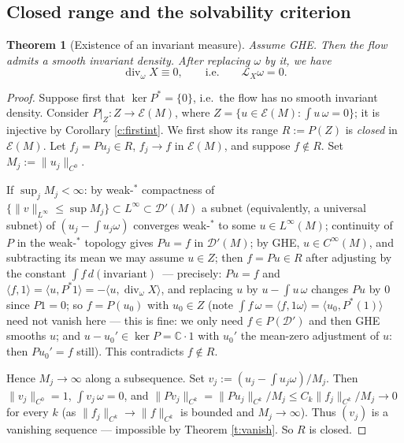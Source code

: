 \documentclass[11pt]{amsart}
\theoremstyle{plain}
\newtheorem{theorem}{Theorem}[section]
\theoremstyle{definition}
\theoremstyle{remark}
\newcommand{\DD}{\mathcal{D}'}
\newcommand{\EE}{\mathcal{E}}
\newcommand{\Lie}{\mathcal{L}}
\begin{document}
\subsection{Closed range and the solvability criterion}

\begin{theorem}[Existence of an invariant measure]\label{t:invmeas}
Assume GHE.  Then the flow admits a smooth invariant density.  After
replacing $\omega$ by it, we have
\begin{equation}\label{eq:divfree}
\operatorname{div}_\omega X\equiv0,\qquad\text{i.e.}\qquad
\Lie_X\omega=0 .
\end{equation}
\end{theorem}

\begin{proof}
Suppose first that $\ker P^*=\{0\}$, i.e.\ the flow has no smooth
invariant density.  Consider $P|_Z:Z\to \EE(M)$, where
$Z=\{u\in\EE(M):\int u\,\omega=0\}$; it is injective by Corollary
\ref{c:firstint}.  We first show its range
$R:=P(Z)$ is \emph{closed} in $\EE(M)$.  Let $f_j=P u_j\in R$,
$f_j\to f$ in $\EE(M)$, and suppose $f\notin R$.  Set
$M_j:=\|u_j\|_{C^0}$.

If $\sup_j M_j<\infty$: by weak-$^{\!*}$ compactness of
$\{\|v\|_{L^\infty}\le\sup M_j\}\subset L^\infty\subset\DD(M)$ a
subnet (equivalently, a universal subnet) of $(u_j-\int u_j\omega)$
converges weak-$^{\!*}$ to some $u\in L^\infty(M)$; continuity of
$P$ in the weak-$^{\!*}$ topology gives $Pu=f$ in $\DD(M)$; by GHE,
$u\in C^\infty(M)$, and subtracting its mean we may assume
$u\in Z$; then $f=Pu\in R$ after adjusting by the constant
$\int f\,d(\text{invariant})$\ --- precisely: $Pu=f$ and
$\langle f,1\rangle=\langle u,P^*1\rangle
=-\langle u,\operatorname{div}_\omega X\rangle$, and replacing
$u$ by $u-\int u\,\omega$ changes $Pu$ by $0$ since $P1=0$; so
$f=P(u_0)$ with $u_0\in Z$ (note $\int f\,\omega=\langle
f,1\omega\rangle=\langle u_0,P^*(1)\rangle$ need not vanish here ---
this is fine: we only need $f\in P(\DD)$ and then GHE smooths $u$;
and $u-u_0'\in\ker P=\mathbb{C}\cdot1$ with $u_0'$ the mean-zero
adjustment of $u$: then $Pu_0'=f$ still).  This contradicts
$f\notin R$.

Hence $M_j\to\infty$ along a subsequence.  Set
$v_j:=(u_j-\int u_j\omega)/M_j$.  Then $\|v_j\|_{C^0}=1$,
$\int v_j\,\omega=0$, and
$\|Pv_j\|_{C^{k}}=\|Pu_j\|_{C^{k}}/M_j\le C_k\|f_j\|_{C^{k}}/M_j\to0$
for every $k$ (as $\|f_j\|_{C^k}\to\|f\|_{C^k}$ is bounded and
$M_j\to\infty$).  Thus $(v_j)$ is a vanishing sequence --- impossible
by Theorem \ref{t:vanish}.  So $R$ is closed.


\end{proof}
\end{document}
